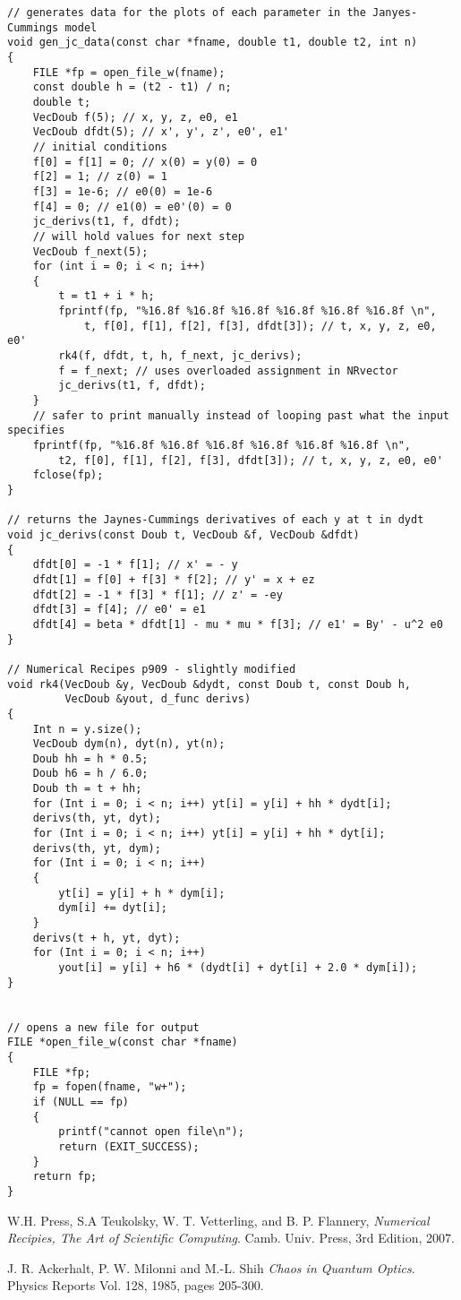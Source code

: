 \documentclass[12pt]{article}
\begin{document}
\begin{lstlisting}
// generates data for the plots of each parameter in the Janyes-Cummings model
void gen_jc_data(const char *fname, double t1, double t2, int n)
{
    FILE *fp = open_file_w(fname);
    const double h = (t2 - t1) / n;
    double t;
    VecDoub f(5); // x, y, z, e0, e1
    VecDoub dfdt(5); // x', y', z', e0', e1'
    // initial conditions
    f[0] = f[1] = 0; // x(0) = y(0) = 0
    f[2] = 1; // z(0) = 1
    f[3] = 1e-6; // e0(0) = 1e-6
    f[4] = 0; // e1(0) = e0'(0) = 0
    jc_derivs(t1, f, dfdt);
    // will hold values for next step
    VecDoub f_next(5);
    for (int i = 0; i < n; i++)
    {
        t = t1 + i * h;
        fprintf(fp, "%16.8f %16.8f %16.8f %16.8f %16.8f %16.8f \n",
            t, f[0], f[1], f[2], f[3], dfdt[3]); // t, x, y, z, e0, e0'
        rk4(f, dfdt, t, h, f_next, jc_derivs);
        f = f_next; // uses overloaded assignment in NRvector
        jc_derivs(t1, f, dfdt);
    }
    // safer to print manually instead of looping past what the input specifies
    fprintf(fp, "%16.8f %16.8f %16.8f %16.8f %16.8f %16.8f \n",
        t2, f[0], f[1], f[2], f[3], dfdt[3]); // t, x, y, z, e0, e0'
    fclose(fp);
}

// returns the Jaynes-Cummings derivatives of each y at t in dydt
void jc_derivs(const Doub t, VecDoub &f, VecDoub &dfdt)
{
    dfdt[0] = -1 * f[1]; // x' = - y
    dfdt[1] = f[0] + f[3] * f[2]; // y' = x + ez
    dfdt[2] = -1 * f[3] * f[1]; // z' = -ey
    dfdt[3] = f[4]; // e0' = e1
    dfdt[4] = beta * dfdt[1] - mu * mu * f[3]; // e1' = By' - u^2 e0
}

// Numerical Recipes p909 - slightly modified
void rk4(VecDoub &y, VecDoub &dydt, const Doub t, const Doub h,
         VecDoub &yout, d_func derivs)
{
    Int n = y.size();
    VecDoub dym(n), dyt(n), yt(n);
    Doub hh = h * 0.5;
    Doub h6 = h / 6.0;
    Doub th = t + hh;
    for (Int i = 0; i < n; i++) yt[i] = y[i] + hh * dydt[i];
    derivs(th, yt, dyt);
    for (Int i = 0; i < n; i++) yt[i] = y[i] + hh * dyt[i];
    derivs(th, yt, dym);
    for (Int i = 0; i < n; i++)
    {
        yt[i] = y[i] + h * dym[i];
        dym[i] += dyt[i];
    }
    derivs(t + h, yt, dyt);
    for (Int i = 0; i < n; i++)
        yout[i] = y[i] + h6 * (dydt[i] + dyt[i] + 2.0 * dym[i]);
}


// opens a new file for output
FILE *open_file_w(const char *fname)
{
    FILE *fp;
    fp = fopen(fname, "w+");
    if (NULL == fp)
    {
        printf("cannot open file\n");
        return (EXIT_SUCCESS);
    }
    return fp;
}
\end{lstlisting}

\begin{thebibliography}{9}

  W.H. Press, S.A Teukolsky, W. T. Vetterling, and B. P. Flannery,
  \emph{Numerical Recipies, The Art of Scientific Computing}.
  Camb. Univ. Press,
  3rd Edition,
  2007.

  J. R. Ackerhalt, P. W. Milonni and M.-L. Shih
  \emph{Chaos in Quantum Optics}.
  Physics Reports Vol. 128,
  1985,
  pages 205-300.


\end{thebibliography}
\end{document}
